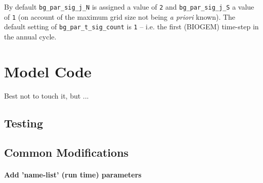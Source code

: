 \documentclass[11pt,fleqn]{book} %
\begin{document}
By default \texttt{bg\_par\_sig\_j\_N} is assigned a value of \texttt{2} and \texttt{bg\_par\_sig\_j\_S} a value of \texttt{1} (on account of the maximum grid size not being \textit{a priori} known).
The default setting of \texttt{bg\_par\_t\_sig\_count} is \texttt{1} -- i.e. the first (BIOGEM) time-step in the annual cycle.


\cleardoublepage


\chapter{Model Code}

\hfill \break

Best not to touch it, but ...


\newpage

%
\section{Testing}

%
%

\newpage

%
\section{Common Modifications}

%
\subsubsection{Add 'name-list' (run time) parameters}
\end{document}
